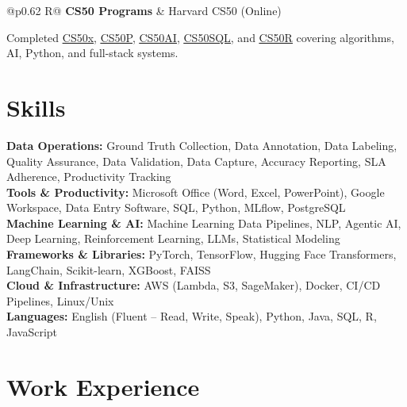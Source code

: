 \documentclass[a4paper,10pt]{article}
\newcommand{\ulink}[2]{\href{#1}{\uline{#2}}}
\newcommand{\subheading}[1]{{\color[HTML]{0A0A0A}\fontsize{12}{14}\selectfont\bfseries #1}}
\newcommand{\meta}[1]{{\color[HTML]{5C5C5C}\fontsize{10.5}{12.5}\selectfont #1}}
\begin{document}
\begin{tabularx}{\linewidth}{@{}p{0.62\linewidth} R@{}}
\subheading{CS50 Programs} & \meta{Harvard CS50 (Online)}
\end{tabularx}
\vspace{1pt}
{\color[HTML]{3A3A3A}\fontsize{11}{14}\selectfont Completed \ulink{https://cs50.harvard.edu/certificates/b14b78df-e05c-413e-a607-1dd27303053a}{CS50x}, \ulink{https://cs50.harvard.edu/certificates/32477052-9db4-49c4-a5a4-d7e58429ca2c}{CS50P}, \ulink{https://cs50.harvard.edu/certificates/9cdb4d4a-1250-4f8e-9fd7-191864e0f919}{CS50AI}, \ulink{https://cs50.harvard.edu/certificates/bc486f24-f085-4e61-8536-80940b97a1b9}{CS50SQL}, and \ulink{https://cs50.harvard.edu/certificates/666838e6-a053-4d82-b179-a60fe745fd84}{CS50R} covering algorithms, AI, Python, and full-stack systems.}

\vspace{2pt}

\section{Skills}
\vspace{5pt}
{\color[HTML]{0A0A0A}\fontsize{11}{14}\selectfont
\textbf{Data Operations:} Ground Truth Collection, Data Annotation, Data Labeling, Quality Assurance, Data Validation, Data Capture, Accuracy Reporting, SLA Adherence, Productivity Tracking \\[2pt]
\textbf{Tools \& Productivity:} Microsoft Office (Word, Excel, PowerPoint), Google Workspace, Data Entry Software, SQL, Python, MLflow, PostgreSQL \\[2pt]
\textbf{Machine Learning \& AI:} Machine Learning Data Pipelines, NLP, Agentic AI, Deep Learning, Reinforcement Learning, LLMs, Statistical Modeling \\[2pt]
\textbf{Frameworks \& Libraries:} PyTorch, TensorFlow, Hugging Face Transformers, LangChain, Scikit-learn, XGBoost, FAISS \\[2pt]
\textbf{Cloud \& Infrastructure:} AWS (Lambda, S3, SageMaker), Docker, CI/CD Pipelines, Linux/Unix \\[2pt]
\textbf{Languages:} English (Fluent -- Read, Write, Speak), Python, Java, SQL, R, JavaScript}

\vspace{2pt}

\section{Work Experience}
\vspace{2pt}
\end{document}
